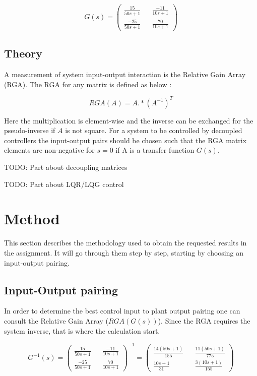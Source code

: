 \documentclass[a4paper, titlepage]{article}
\begin{document}
\begin{equation}
G(s) = 
\begin{pmatrix}
\frac{15}{50s + 1} && \frac{-11}{10s + 1} \\[6pt]
\frac{-25}{50s + 1} && \frac{70}{10s + 1}
\end{pmatrix}
\end{equation}

\subsection{Theory}

A measurement of system input-output interaction is the Relative Gain Array (RGA).
The RGA for any matrix is defined as below \citep[~p.219]{glad00}:

\begin{equation}
RGA(A) = A.*(A^{-1})^T
\end{equation}

Here the multiplication is element-wise and the inverse can be exchanged for the pseudo-inverse if $A$ is not square.
For a system to be controlled by decoupled controllers the input-output pairs should be chosen such that the RGA matrix elements are non-negative for $s=0$ if A is a transfer function $G(s)$.

TODO: Part about decoupling matrices

TODO: Part about LQR/LQG control

\section{Method}
This section describes the methodology used to obtain the requested results in the assignment.
It will go through them step by step, starting by choosing an input-output pairing.

\subsection{Input-Output pairing}
In order to determine the best control input to plant output pairing one can consult the Relative Gain Array ($RGA(G(s))$).
Since the RGA requires the system inverse, that is where the calculation start.

\begin{equation}
G^{-1}(s) = 
\begin{pmatrix}
\frac{15}{50s + 1} && \frac{-11}{10s + 1} \\[6pt]
\frac{-25}{50s + 1} && \frac{70}{10s + 1}
\end{pmatrix}^{-1} = 
\begin{pmatrix}
\frac{14(50s + 1)}{155} && \frac{11(50s + 1)}{775} \\[6pt]
\frac{10s + 1}{31} && \frac{3(10s + 1)}{155}
\end{pmatrix}
\end{equation}
\end{document}
